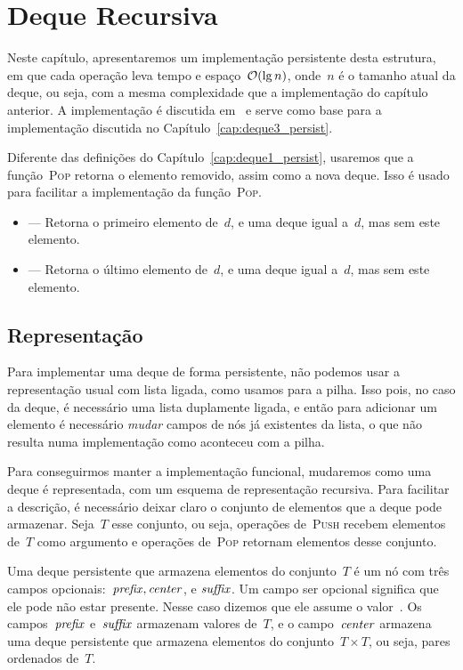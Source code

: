 \documentclass[main.tex]{subfiles}
\begin{document}
\chapter{Deque Recursiva} \label{cap:deque2_persist}

Neste capítulo, apresentaremos um implementação persistente desta estrutura, em que cada operação leva tempo e espaço~$\mathcal{O}(\lg n)$, onde~$n$ é o tamanho atual da deque, ou seja, com a mesma complexidade que a implementação do capítulo anterior. A implementação é discutida em~\cite{Kaplan2001} e serve como base para a implementação discutida no Capítulo~\ref{cap:deque3_persist}.

Diferente das definições do Capítulo~\ref{cap:deque1_persist}, usaremos que a função~\textsc{Pop} retorna o elemento removido, assim como a nova deque. Isso é usado para facilitar a implementação da função~\textsc{Pop}.
\begin{itemize}
	\item {} --- Retorna o primeiro elemento de~$d$, e uma deque igual a~$d$, mas sem este elemento.
	\item {} --- Retorna o último elemento de~$d$, e uma deque igual a~$d$, mas sem este elemento.
\end{itemize}

\section{Representação}

Para implementar uma deque de forma persistente, não podemos usar a representação usual com lista ligada, como usamos para a pilha. Isso pois, no caso da deque, é necessário uma lista duplamente ligada, e então para adicionar um elemento é necessário \emph{mudar} campos de nós já existentes da lista, o que não resulta numa implementação como aconteceu com a pilha.

Para conseguirmos manter a implementação funcional, mudaremos como uma deque é representada, com um esquema de representação recursiva. Para facilitar a descrição, é necessário deixar claro o conjunto de elementos que a deque pode armazenar. Seja~$T$ esse conjunto, ou seja, operações de~\textsc{Push} recebem elementos de~$T$ como argumento e operações de~\textsc{Pop} retornam elementos desse conjunto.

Uma deque persistente que armazena elementos do conjunto~$T$ é um nó com três campos opcionais:~$\mathit{prefix}, \mathit{center}$, e $\mathit{suffix}$. Um campo ser opcional significa que ele pode não estar presente. Nesse caso dizemos que ele assume o valor~. Os campos~$\mathit{prefix}$ e~$\mathit{suffix}$ armazenam valores de~$T$, e o campo~$\mathit{center}$ armazena uma deque persistente que armazena elementos do conjunto~$T \times T$, ou seja, pares ordenados de~$T$.
\end{document}
